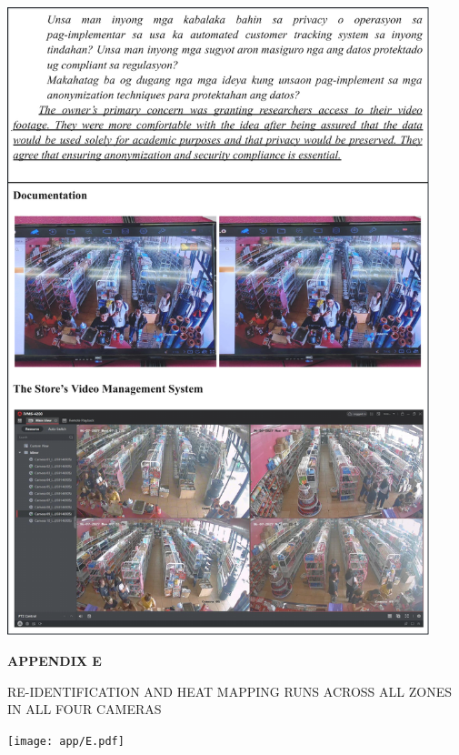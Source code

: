 \begin{center}
	\includegraphics[width=0.92\textwidth]{app/D4.pdf}
\end{center}

\clearpage

\begin{center}
	{\bf APPENDIX E}\\[24pt]
\end{center}

\begin{center}
	RE-IDENTIFICATION AND HEAT MAPPING RUNS ACROSS ALL ZONES IN ALL FOUR CAMERAS
\end{center}

\begin{center}
	\texttt{[image: app/E.pdf]}
\end{center}

\clearpage

